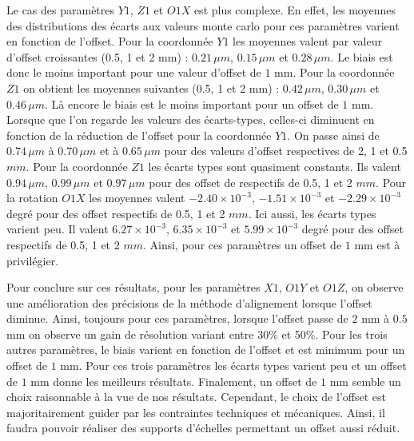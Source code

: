    Le cas des param\`etres $Y1$, $Z1$ et $O1X$ est plus complexe. En effet, les moyennes des distributions des \'ecarts aux valeurs monte carlo pour ces param\`etres varient en fonction de l'offset. Pour la coordonn\'ee $Y1$ les moyennes valent par valeur d'offset croissantes (0.5, 1 et 2 mm) : $0.21 \, \mu m$, $0.15 \, \mu m$ et $0.28 \, \mu m$. Le biais est donc le moins important pour une valeur d'offset de $1$ mm. Pour la coordonn\'ee $Z1$ on obtient les moyennes suivantes (0.5, 1 et 2 mm) : $0.42 \, \mu m$, $0.30 \, \mu m$ et $0.46 \, \mu m$. L\`a encore le biais est le moins important pour un offset de $1$ mm. Lorsque que l'on regarde les valeurs des \'ecarts-types, celles-ci diminuent en fonction de la réduction de l'offset pour la coordonn\'ee $Y1$. On passe ainsi de $0.74 \, \mu m$ \`a $0.70 \, \mu m$ et \`a $0.65 \, \mu m$ pour des valeurs d'offset respectives de 2, 1 et 0.5 $mm$. Pour la coordonn\'ee $Z1$ les \'ecarts types sont quasiment constants. Ils valent $0.94 \, \mu m$, $0.99 \, \mu m$ et $0.97 \, \mu m$ pour des offset de respectifs de 0.5, 1 et 2 $mm$. Pour la rotation $O1X$ les moyennes valent $-2.40 \times 10 ^{-3}$, $-1.51 \times 10 ^{-3}$ et $-2.29 \times 10 ^{-3}$ degr\'e pour des offset respectifs de 0.5, 1 et 2 $mm$. Ici aussi, les \'ecarts types varient peu. Il valent $6.27 \times 10 ^{-3}$, $6.35 \times 10 ^{-3}$ et $5.99 \times 10 ^{-3}$ degr\'e pour des offset respectifs de 0.5, 1 et 2 $mm$. Ainsi, pour ces param\`etres un offset de $1$ mm est \`a privil\'egier.
   
   
   \medskip
   
   Pour conclure sur ces r\'esultats, pour les param\`etres $X1$, $O1Y$ et $O1Z$, on observe une am\'elioration des pr\'ecisions de la m\'ethode d'alignement lorsque l'offset diminue. Ainsi, toujours pour ces param\`etres, lorsque l'offset passe de $2$ mm \`a $0.5$ mm on observe un gain de r\'esolution variant entre 30\% et 50\%. Pour les trois autres param\`etres, le biais varient en fonction de l'offset et est minimum pour un offset de $1$ mm. Pour ces trois param\`etres les \'ecarts types varient peu et un offset de $1$ mm donne les meilleurs r\'esultats. Finalement, un offset de $1$ mm semble un choix raisonnable \`a la vue de nos résultats. Cependant, le choix de l'offset est majoritairement guider par les contraintes techniques et m\'ecaniques. Ainsi, il faudra pouvoir r\'ealiser des supports d'\'echelles permettant un offset aussi r\'eduit. 
   
